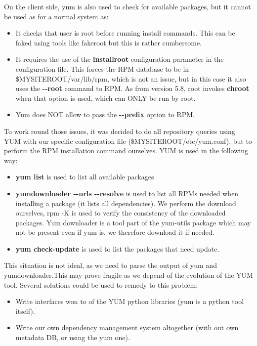 \documentclass{lhcbnote}
\begin{document}
On the client side, yum is also used to check for available packages, but it cannot be used as for a normal system as:
\begin{itemize}
\item It checks that user is root before running install commands. This can be faked using tools like fakeroot but this is rather cumbersome.
\item It requires the use of the \textbf{installroot} configuration parameter in the configuration file. This forces the RPM database to be in \$MYSITEROOT/var/lib/rpm, which is not an issue, but in this case it also uses the  \textbf{\textrm{-}\textrm{-}root} command to RPM. As from version 5.8, root invokes \textbf{chroot} when that option is used, which can ONLY be run by root.
\item Yum does NOT allow to pass the \textbf{\textrm{-}\textrm{-}prefix} option to RPM.
\end{itemize}

To work round those issues, it was decided to do all repository queries using YUM with our specific configuration file (\$MYSITEROOT/etc/yum.conf), but to perform the RPM installation command ourselves. YUM is used in the following way:

\begin{itemize}
\item \textbf{yum list} is used to list all available packages 
\item \textbf{yumdownloader \textrm{-}\textrm{-}urls \textrm{-}\textrm{-}resolve} is used to list all RPMs needed when installing a package (it lists all dependencies). We perform the download ourselves, rpm -K is used to verify the consistency of the downloaded packages. Yum downloader is a tool part of the yum-utils package which may not be present even if yum is, we therefore download it if needed.
\item \textbf{yum check\textrm{-}update} is used to list the packages that need update.
\end{itemize}

This situation is not ideal, as we need to parse the output of yum and yumdownloader.This may prove fragile as we depend of the evolution of the YUM tool. Several solutions could be used to remedy to this problem:
\begin{itemize}
\item Write interfaces won to of the YUM python libraries (yum is a python tool itself).
\item Write our own dependency management system altogether (with out own metadata DB, or using the yum one).
\end{itemize}
\end{document}
